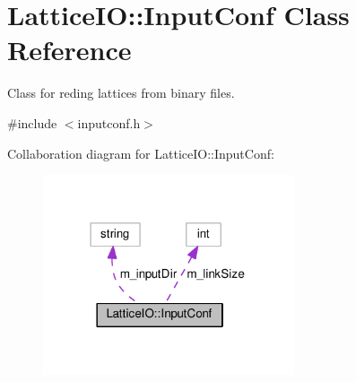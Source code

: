 \hypertarget{classLatticeIO_1_1InputConf}{}\section{Lattice\+IO\+:\+:Input\+Conf Class Reference}
\label{classLatticeIO_1_1InputConf}


Class for reding lattices from binary files.  




{\ttfamily \#include $<$inputconf.\+h$>$}



Collaboration diagram for Lattice\+IO\+:\+:Input\+Conf\+:\nopagebreak
\begin{figure}[H]
\begin{center}
\leavevmode
\includegraphics[width=210pt]{d0/d42/classLatticeIO_1_1InputConf__coll__graph}
\end{center}
\end{figure}
